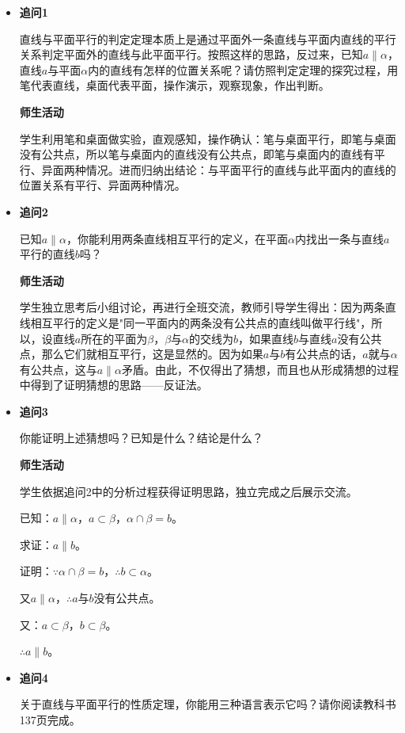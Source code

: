\documentclass[UTF8,a4paper,12pt,twoside]{ctexart}
\begin{document}
\begin{enumerate}
\begin{itemize}
    \item \textbf{追问1}

直线与平面平行的判定定理本质上是通过平面外一条直线与平面内直线的平行关系判定平面外的直线与此平面平行。按照这样的思路，反过来，已知$a\parallel\alpha$，直线$a$与平面$\alpha$内的直线有怎样的位置关系呢？请仿照判定定理的探究过程，用笔代表直线，桌面代表平面，操作演示，观察现象，作出判断。

\textbf{师生活动}

学生利用笔和桌面做实验，直观感知，操作确认：笔与桌面平行，即笔与桌面没有公共点，所以笔与桌面内的直线没有公共点，即笔与桌面内的直线有平行、异面两种情况。进而归纳出结论：与平面平行的直线与此平面内的直线的位置关系有平行、异面两种情况。

    \item \textbf{追问2}

已知$a\parallel\alpha$，你能利用两条直线相互平行的定义，在平面$\alpha$内找出一条与直线$a$平行的直线$b$吗？

\textbf{师生活动}

学生独立思考后小组讨论，再进行全班交流，教师引导学生得出：因为两条直线相互平行的定义是"同一平面内的两条没有公共点的直线叫做平行线"，所以，设直线$a$所在的平面为$\beta$，$\beta$与$\alpha$的交线为$b$，如果直线$b$与直线$a$没有公共点，那么它们就相互平行，这是显然的。因为如果$a$与$b$有公共点的话，$a$就与$\alpha$有公共点，这与$a\parallel\alpha$矛盾。由此，不仅得出了猜想，而且也从形成猜想的过程中得到了证明猜想的思路——反证法。

    \item \textbf{追问3}

你能证明上述猜想吗？已知是什么？结论是什么？

\textbf{师生活动}

学生依据追问2中的分析过程获得证明思路，独立完成之后展示交流。

已知：$a\parallel\alpha$，$a\subset\beta$，$\alpha\cap\beta=b$。

求证：$a\parallel b$。

证明：$\because\alpha\cap\beta=b$，$\therefore b\subset\alpha$。

又$a\parallel\alpha$，$\therefore a$与$b$没有公共点。

又：$a\subset\beta$，$b\subset\beta$。

$\therefore a\parallel b$。

    \item \textbf{追问4}

关于直线与平面平行的性质定理，你能用三种语言表示它吗？请你阅读教科书137页完成。


\end{itemize}
\end{enumerate}
\end{document}
